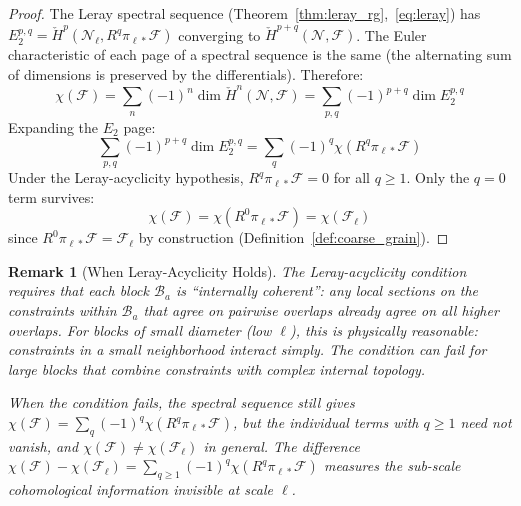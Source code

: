 \documentclass[11pt,letterpaper]{article}
\newtheorem{remark}[conjecture]{Remark}
\newcommand{\Hcech}{\check{H}}
\newcommand{\sheaf}{\mathcal{F}}
\newcommand{\nerve}{\mathcal{N}}
\newcommand{\block}{\mathcal{B}}
\begin{document}
\begin{proof}
The Leray spectral sequence 
(Theorem~\ref{thm:leray_rg},~\eqref{eq:leray}) has $E_2^{p,q} = 
\Hcech^p(\nerve_\ell, R^q \pi_{\ell *} \sheaf)$ converging to 
$\Hcech^{p+q}(\nerve, \sheaf)$. The Euler characteristic of each 
page of a spectral sequence is the same (the alternating sum of 
dimensions is preserved by the differentials). Therefore:
\begin{equation}\label{eq:euler_pages}
    \chi(\sheaf) = \sum_n (-1)^n \dim \Hcech^n(\nerve, \sheaf) 
    = \sum_{p,q} (-1)^{p+q} \dim E_2^{p,q}
\end{equation}
Expanding the $E_2$ page:
\begin{equation}\label{eq:euler_expand}
    \sum_{p,q} (-1)^{p+q} \dim E_2^{p,q} 
    = \sum_q (-1)^q \chi(R^q \pi_{\ell *} \sheaf)
\end{equation}
Under the Leray-acyclicity hypothesis, $R^q \pi_{\ell *} \sheaf = 0$ 
for all $q \geq 1$. Only the $q = 0$ term survives:
\[
    \chi(\sheaf) = \chi(R^0 \pi_{\ell *} \sheaf) 
    = \chi(\sheaf_\ell)
\]
since $R^0 \pi_{\ell *} \sheaf = \sheaf_\ell$ by construction 
(Definition~\ref{def:coarse_grain}).
\end{proof}

\begin{remark}[When Leray-Acyclicity Holds]
\label{rem:leray_acyclic}
The Leray-acyclicity condition requires that each block 
$\block_a$ is ``internally coherent'': any local sections on the 
constraints within $\block_a$ that agree on pairwise overlaps 
already agree on all higher overlaps. For blocks of small diameter 
(low $\ell$), this is physically reasonable: constraints in a 
small neighborhood interact simply. The condition can fail for 
large blocks that combine constraints with complex internal 
topology.

When the condition fails, the spectral sequence still gives 
$\chi(\sheaf) = \sum_q (-1)^q \chi(R^q \pi_{\ell *} \sheaf)$, 
but the individual terms with $q \geq 1$ need not vanish, and 
$\chi(\sheaf) \neq \chi(\sheaf_\ell)$ in general. The difference 
$\chi(\sheaf) - \chi(\sheaf_\ell) = \sum_{q \geq 1} (-1)^q 
\chi(R^q \pi_{\ell *} \sheaf)$ measures the sub-scale 
cohomological information invisible at scale $\ell$.
\end{remark}
\end{document}
